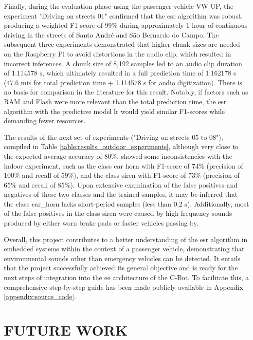 Finally, during the evaluation phase using the passenger vehicle VW UP, the experiment "Driving on streets 01" confirmed that the \gls{esr} algorithm was robust, producing a weighted F1-score of 99\% during approximately 1 hour of continuous driving in the streets of Santo André and São Bernardo do Campo. The subsequent three experiments demonstrated that higher chunk sizes are needed on the Raspberry Pi to avoid distortions in the audio clip, which resulted in incorrect inferences. A chunk size of 8,192 samples led to an audio clip duration of 1.114578 \gls{s}, which ultimately resulted in a full prediction time of 1.162178 \gls{s} (47.6 \gls{mi}\gls{s} for total prediction time + 1.114578 \gls{s} for audio digitization). There is no basis for comparison in the literature for this result. Notably, if factors such as RAM and Flash were more relevant than the total prediction time, the \gls{esr} algorithm with the predictive model \gls{lr} would yield similar F1-scores while demanding fewer resources.

The results of the next set of experiments ("Driving on streets 05 to 08"), compiled in Table \ref{table:results_outdoor_experiments}, although very close to the expected average accuracy of 80\%, showed some inconsistencies with the indoor experiment, such as the class car horn with F1-score of 74\% (precision of 100\% and recall of 59\%), and the class siren with F1-score of 73\% (precision of 65\% and recall of 85\%). Upon extensive examination of the false positives and negatives of these two classes and the trained samples, it may be inferred that the class car\_horn lacks short-period samples (less than 0.2 \gls{s}). Additionally, most of the false positives in the class siren were caused by high-frequency sounds produced by either worn brake pads or faster vehicles passing by.

Overall, this project contributes to a better understanding of the \gls{esr} algorithm in embedded systems within the context of a passenger vehicle, demonstrating that environmental sounds other than emergency vehicles can be detected. It entails that the project successfully achieved its general objective and is ready for the next steps of integration into the \gls{ee} architecture of the C-Bot. To facilitate this, a comprehensive step-by-step guide has been made publicly available in Appendix \ref{appendix:source_code}.


\section{FUTURE WORK}
\label{sec:results_future_work}

